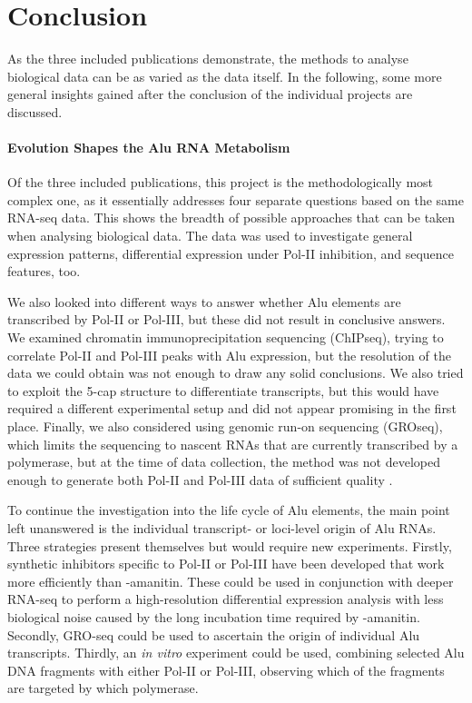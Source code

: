 
\chapter{Conclusion}

As the three included publications demonstrate, the methods to analyse
biological data can be as varied as the data itself. In the following, some
more general insights gained after the conclusion of the individual projects
are discussed.

\subsubsection{Evolution Shapes the Alu RNA Metabolism}
\label{subsubsec:alus}
Of the three included publications, this project is the methodologically most
complex one, as it essentially addresses four separate questions based on the
same RNA-seq data. This shows the breadth of possible approaches that can be
taken when analysing biological data. The data was used to investigate general
expression patterns, differential expression under Pol-II inhibition, and
sequence features, too.

We also looked into different ways to answer whether Alu elements are
transcribed by Pol-II or Pol-III, but these did not result in conclusive
answers. We examined chromatin immunoprecipitation sequencing (ChIPseq),
trying to correlate Pol-II and Pol-III peaks with Alu expression, but the
resolution of the data we could obtain was not enough to draw any solid
conclusions. We also tried to exploit the 5\textquotesingle-cap structure to
differentiate transcripts, but this would have required a different
experimental setup and did not appear promising in the first place. Finally,
we also considered using genomic run-on sequencing (GROseq), which limits the
sequencing to nascent RNAs that are currently transcribed by a polymerase, but
at the time of data collection, the method was not developed enough to
generate both Pol-II and Pol-III data of sufficient quality \citep{Gardini2017}.

To continue the investigation into the life cycle of Alu elements, the main
point left unanswered is the individual transcript- or loci-level origin of
Alu RNAs. Three strategies present themselves but would require new
experiments. Firstly, synthetic inhibitors specific to Pol-II or Pol-III have
been developed that work more efficiently than \textalpha-amanitin. These
could be used in conjunction with deeper RNA-seq to perform a high-resolution
differential expression analysis with less biological noise caused by the long
incubation time required by \textalpha-amanitin. Secondly, GRO-seq could be
used to ascertain the origin of individual Alu transcripts. Thirdly, an
\textit{in vitro} experiment could be used, combining selected Alu DNA
fragments with either Pol-II or Pol-III, observing which of the fragments are
targeted by which polymerase.

